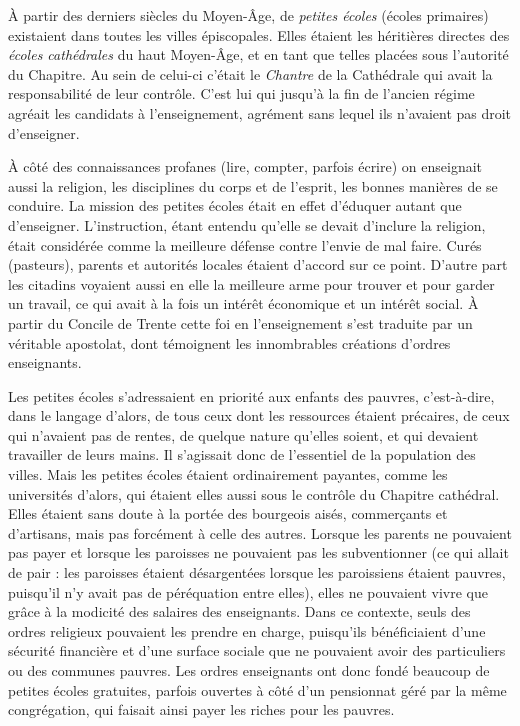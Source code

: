  À partir des derniers siècles du Moyen-Âge, de \emph{petites écoles} (écoles primaires) existaient dans toutes les villes épiscopales. Elles étaient les héritières directes des \emph{écoles cathédrales} du haut Moyen-Âge, et en tant que telles placées sous l'autorité du Chapitre. Au sein de celui-ci c'était le \emph{Chantre} de la Cathédrale qui avait la responsabilité de leur contrôle. C'est lui qui jusqu'à la fin de l'ancien régime agréait les candidats à l'enseignement, agrément sans lequel ils n'avaient pas droit d'enseigner. 

 À côté des connaissances profanes (lire, compter, parfois écrire) on enseignait aussi la religion, les disciplines du corps et de l'esprit, les bonnes manières de se conduire. La mission des petites écoles était en effet d'éduquer autant que d'enseigner. L'instruction, étant entendu qu'elle se devait d'inclure la religion, était considérée comme la meilleure défense contre l'envie de mal faire. Curés (pasteurs), parents et autorités locales étaient d'accord sur ce point. D'autre part les citadins voyaient aussi en elle la meilleure arme pour trouver et pour garder un travail, ce qui avait à la fois un intérêt économique et un intérêt social. À partir du Concile de Trente cette foi en l'enseignement s'est traduite par un véritable apostolat, dont témoignent les innombrables créations d'ordres enseignants. 

 Les petites écoles s'adressaient en priorité aux enfants des pauvres, c'est-à-dire, dans le langage d'alors, de tous ceux dont les ressources étaient précaires, de ceux qui n'avaient pas de rentes, de quelque nature qu'elles soient, et qui devaient travailler de leurs mains. Il s'agissait donc de l'essentiel de la population des villes. Mais les petites écoles étaient ordinairement payantes, comme les universités d'alors, qui étaient elles aussi sous le contrôle du Chapitre cathédral. Elles étaient sans doute à la portée des bourgeois aisés, commerçants et d'artisans, mais pas forcément à celle des autres. Lorsque les parents ne pouvaient pas payer et lorsque les paroisses ne pouvaient pas les subventionner (ce qui allait de pair : les paroisses étaient désargentées lorsque les paroissiens étaient pauvres, puisqu'il n'y avait pas de péréquation entre elles), elles ne pouvaient vivre que grâce à la modicité des salaires des enseignants. Dans ce contexte, seuls des ordres religieux pouvaient les prendre en charge, puisqu'ils bénéficiaient d'une sécurité financière et d'une surface sociale que ne pouvaient avoir des particuliers ou des communes pauvres. Les ordres enseignants ont donc fondé beaucoup de petites écoles gratuites, parfois ouvertes à côté d'un pensionnat géré par la même congrégation, qui faisait ainsi payer les riches pour les pauvres. 

